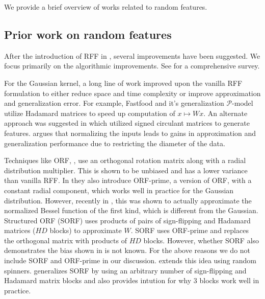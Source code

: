 \documentclass{article}
\def\cite{\citep}
\theoremstyle{plain}
\begin{document}
We provide a brief overview of works related to random features.

\subsection{Prior work on random features}

After the introduction of RFF in \cite{rahimi2007random}, several improvements have been suggested. We focus primarily on the algorithmic improvements. See \cite{liu2021random} for a comprehensive survey. 

For the Gaussian kernel, a long line of work improved upon the vanilla RFF formulation to either reduce space and time complexity or improve approximation and generalization error. For example, Fastfood \cite{Fastfood} and it's generalization $\mathcal{P}$-model \cite{P_model} utilize Hadamard matrices to speed up computation of $x\mapsto Wx$. An alternate approach was suggested in \cite{scrf} which utilized signed circulant matrices to generate features. \cite{NRFF} argues that  normalizing the inputs leads to gains in approximation and generalization performance due to restricting the diameter of the data.

\begin{remark}
    Techniques like ORF, \cite{yu2016orthogonal}, use an orthogonal rotation matrix along with a radial distribution multiplier. This is shown to be unbiased and has a lower variance than vanilla RFF. In \cite{yu2016orthogonal} they also introduce ORF-prime, a version of ORF, with a constant radial component, which works well in practice for the Gaussian distribution. However, recently in \cite[Thm. 2]{demni2024orthogonal}, this was shown to actually approximate the normalized Bessel function of the first kind, which is different from the Gaussian. Structured ORF (SORF) \cite{yu2016orthogonal} uses products of pairs of sign-flipping and Hadamard matrices ($HD$ blocks) to approximate $W$. SORF uses ORF-prime and replaces the orthogonal matrix with products of $HD$ blocks. However, whether SORF also demonstrates the  bias shown in \cite{demni2024orthogonal} is not known. For the above reasons we do not include SORF and ORF-prime in our discussion. \cite{Bojarski2016StructuredAA} extends this idea using random spinners. \cite{ROM_} generalizes SORF by using an arbitrary number of sign-flipping and Hadamard matrix blocks and also provides intution for why 3 blocks work well in practice. 
\end{remark}
\end{document}
